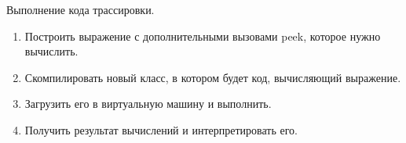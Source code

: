 \begin{frame}
\frametitle{\insertsection} 
\framesubtitle{\insertsubsection}
Выполнение кода трассировки.
\begin{enumerate}
	\item Построить выражение с дополнительными вызовами peek, которое нужно вычислить.
	\item Скомпилировать новый класс, в котором будет код, вычисляющий выражение.
	\item Загрузить его в виртуальную машину и выполнить.
	\item Получить результат вычислений и интерпретировать его.
\end{enumerate}
\end{frame}
